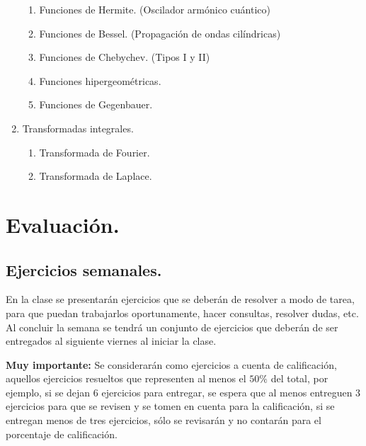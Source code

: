 \documentclass[12pt]{article}
\begin{document}
\begin{enumerate}
\begin{enumerate}
\item Funciones de Hermite. (Oscilador armónico cuántico)
\item Funciones de Bessel. (Propagación de ondas cilíndricas)
\item Funciones de Chebychev. (Tipos I y II)
\item Funciones hipergeométricas.
\item Funciones de Gegenbauer.
\end{enumerate}
\item Transformadas integrales.
\begin{enumerate}
\item Transformada de Fourier.
\item Transformada de Laplace.
\end{enumerate}
\end{enumerate}
\section{Evaluación.}
\subsection{Ejercicios semanales.}
En la  clase se presentarán ejercicios que se deberán de resolver a modo de tarea, para que puedan trabajarlos oportunamente, hacer consultas, resolver dudas, etc. Al concluir la semana se tendrá un conjunto de ejercicios que deberán de ser entregados al siguiente viernes al iniciar la clase.
\par
\textbf{Muy importante:} Se considerarán como ejercicios a cuenta de calificación, aquellos ejercicios resueltos que representen al menos el $50\%$ del total, por ejemplo, si se dejan 6 ejercicios para entregar, se espera que al menos entreguen 3 ejercicios para que se revisen y se tomen en cuenta para la calificación, si se entregan menos de tres ejercicios, sólo se revisarán y no contarán para el porcentaje de calificación.
\end{document}
